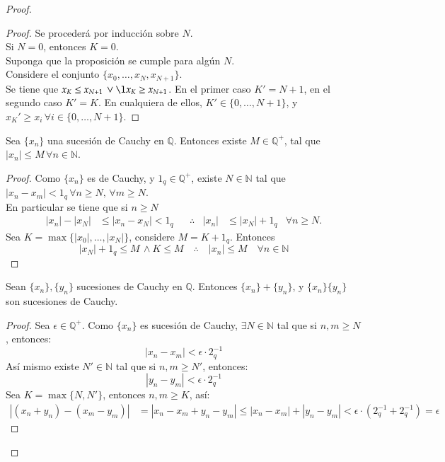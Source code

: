 \begin{proof}
\begin{proof}
  Se procederá por inducción sobre $N$.\\
  Si $N=0$, entonces $K=0$. \\
  Suponga que la proposición se cumple para algún $N$. \\
  Considere el conjunto $\{x_0, \ldots, x_N, x_{N+1}\}$. \\
  Se tiene que $x_K \leq x_{N+1} \, \lor \l x_K \geq x_{N+1}$.
  En el primer caso  $K' = N+1$, en el segundo caso $K' = K$. En cualquiera de
  ellos, $K' \in \{0, \ldots, N+1 \}$, y $x_K' \geq x_i \, \forall i \in \{0,
  \ldots, N+1\}$.
\end{proof}
\begin{proposition}\label{prop:42}
  Sea $\{x_n\}$ una sucesión de Cauchy en $\mathbb{Q}$. Entonces existe $M \in
  \mathbb{Q}^+$, tal que $|x_n| \leq M \, \forall n  \in \mathbb{N}$. 
\end{proposition}
\begin{proof}
  Como $\{x_n\}$ es de Cauchy, y $1_q \in \mathbb{Q}^+$, existe $N \in
  \mathbb{N}$ tal que $|x_n -x_m| < 1_q \, \forall n \geq N, \, \forall m \geq
  N$.\\
  En particular se tiene que si $n \geq N$ 
  \begin{align*}
    |x_n| - |x_N| &\leq |x_n - x_N| < 1_q & &\therefore & |x_n| &\leq |x_N|
    + 1_q &\forall n \geq N.
  \end{align*}
  Sea $K= \max\{|x_0|, \ldots, |x_N|\}$, considere $M = K + 1_q$. Entonces
  \[
    |x_N| + 1_q \leq M \, \land K \leq M \quad \therefore \quad |x_n| \leq M
    \quad \forall n \in \mathbb{N}
  \]
\end{proof}
\begin{proposition}\label{prop:43}
  Sean $\{x_n\}, \{y_n\}$ sucesiones de Cauchy en $\mathbb{Q}$. Entonces
  $\{x_n\} + \{y_n\}$, y $\{x_n\}\{y_n\}$ son sucesiones de Cauchy.
\end{proposition}
\begin{proof}
  Sea $\epsilon \in \mathbb{Q}^+$. Como $\{x_n\}$ es sucesión de Cauchy,
  $\exists N \in \mathbb{N}$ tal que si $n,m \geq N$, entonces:
  \[
    |x_n - x_m| < \epsilon \cdot 2_q^{-1}
  \]
  Así mismo existe $N' \in \mathbb{N}$ tal que si $n,m \geq N'$, entonces:
  \[
    |y_n - y_m| < \epsilon \cdot 2_q^{-1}
  \]
  Sea $K = \max \{N, N'\}$, entonces $n,m \geq K$, así:
  \begin{align*}
    |(x_n +y_n) - (x_m -y_m)| &= |x_n -x_m +y_n -y_m | \leq |x_n - x_m| +
    |y_n -y_m| < \epsilon \cdot (2_q^{-1} + 2_q^{-1}) = \epsilon
  \end{align*}

\end{proof}
\end{proof}
